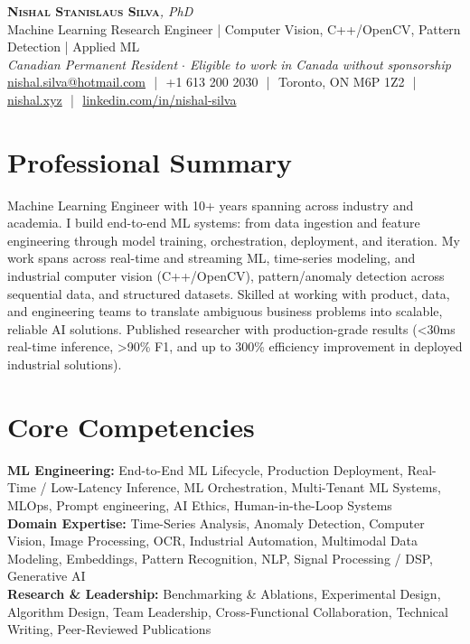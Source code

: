 \documentclass[11pt]{article}
\begin{document}
\pagestyle{empty}
\begin{center}
    {\LARGE \scshape \textbf{Nishal Stanislaus Silva}}{\large \textit{, PhD}}
    \\[1pt]
    {\small Machine Learning Research Engineer | Computer Vision, C++/OpenCV, Pattern Detection | Applied ML}
    \\[1pt]
    {\footnotesize\textit{Canadian Permanent Resident $\cdot$ Eligible to work in Canada without sponsorship}}
    \\[1pt]
    {\small \href{mailto:nishal.silva@hotmail.com}{nishal.silva@hotmail.com}
    \,\,|\,\, +1 613 200 2030
    \,\,|\,\, Toronto, ON M6P 1Z2
    \,\,|\,\, \href{https://nishal.xyz}{nishal.xyz}
    \,\,|\,\, \href{https://www.linkedin.com/in/nishal-silva}{linkedin.com/in/nishal-silva}}
\end{center}

\section*{Professional Summary}
Machine Learning Engineer with 10+ years spanning across industry and academia. I build end-to-end ML systems: from data ingestion and feature engineering through model training, orchestration, deployment, and iteration. My work spans across real-time and streaming ML, time-series modeling, and industrial computer vision (C++/OpenCV), pattern/anomaly detection across sequential data, and structured datasets. Skilled at working with product, data, and engineering teams to translate ambiguous business problems into scalable, reliable AI solutions. Published researcher with production-grade results (<30ms real-time inference, >90\% F1, and up to 300\% efficiency improvement in deployed industrial solutions).

\section*{Core Competencies}
\textbf{ML Engineering:} End-to-End ML Lifecycle, Production Deployment, Real-Time / Low-Latency Inference, ML Orchestration, Multi-Tenant ML Systems, MLOps, Prompt engineering, AI Ethics, Human-in-the-Loop Systems\\
\textbf{Domain Expertise:} Time-Series Analysis, Anomaly Detection, Computer Vision, Image Processing, OCR, Industrial Automation, Multimodal Data Modeling, Embeddings, Pattern Recognition, NLP, Signal Processing / DSP, Generative AI\\
\textbf{Research \& Leadership:} Benchmarking \& Ablations, Experimental Design, Algorithm Design, Team Leadership, Cross-Functional Collaboration, Technical Writing, Peer-Reviewed Publications
\end{document}
